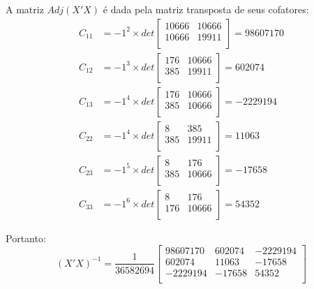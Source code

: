 \documentclass[]{ufpe-exercises}
\begin{document}
\begin{questions}
\begin{parts}
\begin{solution}
			A matriz \(Adj(X'X)\) é dada pela matriz transposta de seus cofatores:
			\begin{align*}
				C_{11} & = -1^{2} \times det
				\begin{bmatrix}
					10666 & 10666 \\
					10666 & 19911 \\
				\end{bmatrix}
				= 98607170
				\\
				C_{12} & = -1^{3} \times det
				\begin{bmatrix}
					176 & 10666 \\
					385 & 19911 \\
				\end{bmatrix}
				= 602074
				\\
				C_{13} & = -1^{4} \times det
				\begin{bmatrix}
					176 & 10666 \\
					385 & 10666 \\
				\end{bmatrix}
				= -2229194
				\\
				C_{22} & = -1^{4} \times det
				\begin{bmatrix}
					8   & 385   \\
					385 & 19911 \\
				\end{bmatrix}
				= 11063
				\\
				C_{23} & = -1^{5} \times det
				\begin{bmatrix}
					8   & 176   \\
					385 & 10666 \\
				\end{bmatrix}
				= -17658
				\\
				C_{33} & = -1^{6} \times det
				\begin{bmatrix}
					8   & 176   \\
					176 & 10666 \\
				\end{bmatrix}
				= 54352
			\end{align*}

			Portanto:
			\[
				(X'X)^{-1} = \frac{1}{36582694}
				\begin{bmatrix}
					98607170 & 602074 & -2229194 \\
					602074   & 11063  & -17658   \\
					-2229194 & -17658 & 54352    \\
				\end{bmatrix}
			\]


\end{solution}
\end{parts}
\end{questions}
\end{document}
